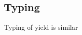 \documentclass[runningheads,a4paper]{llncs}
\begin{document}

\subsection{Typing}
\label{sec:semantics-typing}

Typing of yield is similar 

\newcommand{\mtyp}[1]{M #1}
\newcommand{\ntyp}[1]{N #1}
\newcommand{\ltyp}[1]{L #1}
\newcommand{\dtyp}[1]{D #1}

\newcommand{\tya}[2]{#1\hspace{-0.15em}:\hspace{-0.15em}#2}
\newcommand{\cvdash}{\vartriangleright_\sigma}
\newcommand{\unit}{\ident{unit}}
\end{document}
